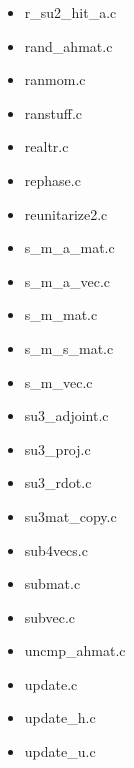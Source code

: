 \begin{multicols}{3}
\begin{itemize}
\begin{itemize}
		\item r\_su2\_hit\_a.c
		\item rand\_ahmat.c
		\item ranmom.c
		\item ranstuff.c
		\item realtr.c
		\item rephase.c
		\item reunitarize2.c
		\item s\_m\_a\_mat.c
		\item s\_m\_a\_vec.c
		\item s\_m\_mat.c
		\item s\_m\_s\_mat.c
		\item s\_m\_vec.c
		\item su3\_adjoint.c
		\item su3\_proj.c
		\item su3\_rdot.c
		\item su3mat\_copy.c
		\item sub4vecs.c
		\item submat.c
		\item subvec.c
		\item uncmp\_ahmat.c
		\item update.c
		\item update\_h.c
		\item update\_u.c
	\end{itemize}


\end{itemize}
\end{multicols}
